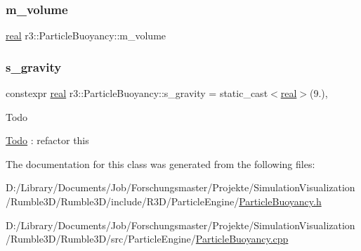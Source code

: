 \mbox{\label{classr3_1_1_particle_buoyancy_ade7d34f053371dadc2113563760599c9}} 
\subsubsection{\texorpdfstring{m\+\_\+volume}{m\_volume}}
{\footnotesize\ttfamily \mbox{\hyperlink{namespacer3_ab2016b3e3f743fb735afce242f0dc1eb}{real}} r3\+::\+Particle\+Buoyancy\+::m\+\_\+volume\hspace{0.3cm}{\ttfamily [protected]}}

\mbox{\label{classr3_1_1_particle_buoyancy_a15857a4724e0e91efd9ce45831d00cbd}} 
\subsubsection{\texorpdfstring{s\+\_\+gravity}{s\_gravity}}
{\footnotesize\ttfamily constexpr \mbox{\hyperlink{namespacer3_ab2016b3e3f743fb735afce242f0dc1eb}{real}} r3\+::\+Particle\+Buoyancy\+::s\+\_\+gravity = static\+\_\+cast$<$\mbox{\hyperlink{namespacer3_ab2016b3e3f743fb735afce242f0dc1eb}{real}}$>$(9.)\hspace{0.3cm}{\ttfamily [static]}, {\ttfamily [protected]}}

\begin{DoxyRefDesc}{Todo}
\item[\mbox{\hyperlink{todo__todo000001}{Todo}}]\+: refactor this \end{DoxyRefDesc}


The documentation for this class was generated from the following files\+:\begin{DoxyCompactItemize}
\item 
D\+:/\+Library/\+Documents/\+Job/\+Forschungsmaster/\+Projekte/\+Simulation\+Visualization/\+Rumble3\+D/\+Rumble3\+D/include/\+R3\+D/\+Particle\+Engine/\mbox{\hyperlink{_particle_buoyancy_8h}{Particle\+Buoyancy.\+h}}\item 
D\+:/\+Library/\+Documents/\+Job/\+Forschungsmaster/\+Projekte/\+Simulation\+Visualization/\+Rumble3\+D/\+Rumble3\+D/src/\+Particle\+Engine/\mbox{\hyperlink{_particle_buoyancy_8cpp}{Particle\+Buoyancy.\+cpp}}\end{DoxyCompactItemize}
